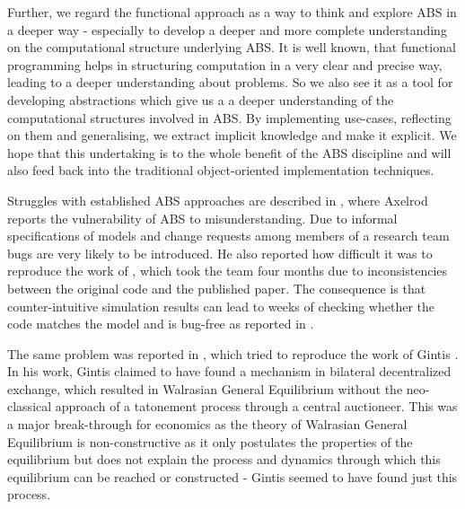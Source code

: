Further, we regard the functional approach as a way to think and explore ABS in a deeper way - especially to develop a deeper and more complete understanding on the computational structure underlying ABS. It is well known, that functional programming helps in structuring computation in a very clear and precise way, leading to a deeper understanding about problems. So we also see it as a tool for developing abstractions which give us a a deeper understanding of the computational structures involved in ABS. By implementing use-cases, reflecting on them and generalising, we extract implicit knowledge and make it explicit. We hope that this undertaking is to the whole benefit of the ABS discipline and will also feed back into the traditional object-oriented implementation techniques.

\bigskip

Struggles with established ABS approaches are described in \cite{axelrod_chapter_2006}, where Axelrod reports the vulnerability of ABS to misunderstanding. Due to informal specifications of models and change requests among members of a research team bugs are very likely to be introduced. He also reported how difficult it was to reproduce the work of \cite{axelrod_convergence_1995}, which took the team four months due to inconsistencies between the original code and the published paper. The consequence is that counter-intuitive simulation results can lead to weeks of checking whether the code matches the model and is bug-free as reported in \cite{axelrod_advancing_1997}.

The same problem was reported in \cite{ionescu_dependently-typed_2012}, which tried to reproduce the work of Gintis \cite{gintis_emergence_2006}. In his work, Gintis claimed to have found a mechanism in bilateral decentralized exchange, which resulted in Walrasian General Equilibrium without the neo-classical approach of a tatonement process through a central auctioneer. This was a major break-through for economics as the theory of Walrasian General Equilibrium is non-constructive as it only postulates the properties of the equilibrium \cite{colell_microeconomic_1995} but does not explain the process and dynamics through which this equilibrium can be reached or constructed - Gintis seemed to have found just this process.

